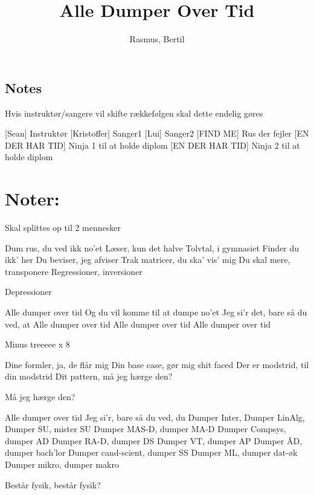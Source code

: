\documentclass[a4paper,11pt]{article}
\title{Alle Dumper Over Tid}
\author{Rasmus, Bertil}
\begin{document}
\maketitle
\subsection*{Notes} Hvis instruktør/sangere vil skifte rækkefølgen skal dette endelig gøres\\


\begin{props}
\prop{}
\prop{}
\prop{}
\prop{}
\end{props}

\begin{roles}
[Sean] Instruktør
 [Kristoffer] Sanger1
 [Lui] Sanger2
 [FIND ME] Rus der fejler
 [EN DER HAR TID] Ninja 1 til at holde diplom
 [EN DER HAR TID] Ninja 2 til at holde diplom
\end{roles}

\section*{Noter:}Skal splittes op til 2 mennesker


\begin{song}
%
Dum rus, du ved ikk no’et
Læser, kun det halve
Tolvtal, i gymnasiet
Finder du ikk’ her
%
Du beviser, jeg afviser
Trak matricer, du ska’ vis’ mig
Du skal mere, transponere
Regressioner, inversioner

%
Depressioner

% 
Alle dumper over tid
Og du vil komme til at dumpe no’et
Jeg si’r det, bare så du ved, at
Alle dumper over tid
Alle dumper over tid
Alle dumper over tid
 
% 
Minus treeeee x 8
 
%
Dine formler, ja, de flår mig
Din base case, gør mig shit faced
Der er modstrid, til din modstrid
Dit pattern, må jeg hærge den?

% 
Må jeg hærge den?

Alle dumper over tid
Jeg si’r, bare så du ved, du
Dumper Inter, Dumper LinAlg,
Dumper SU, mister SU
Dumper MAS-D,  dumper MA-D
Dumper Compsys, dumper AD
Dumper RA-D, dumper DS 
Dumper VT,  dumper AP
Dumper ÅD, dumper bach’lor
Dumper cand-scient, dumper SS
Dumper ML, dumper dat-øk
Dumper mikro, dumper makro
 
Består fysik, består fysik?
\end{song}
\end{document}
